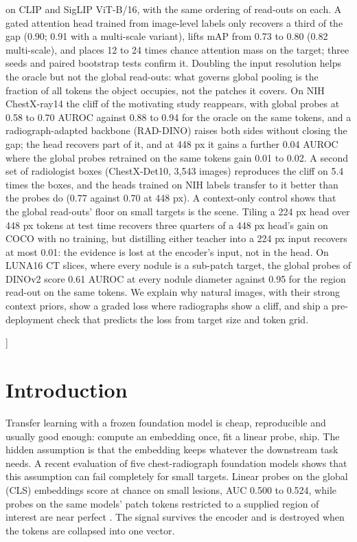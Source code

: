 \documentclass[10pt,letterpaper,twocolumn]{article}
\begin{document}
\begin{@twocolumnfalse}
\begin{list}{}{\setlength{\leftmargin}{0.55in}\setlength{\rightmargin}{0.55in}}
on CLIP and SigLIP ViT-B/16, with the same ordering of read-outs on each. A gated attention head trained from image-level labels only
recovers a third of the gap (0.90; 0.91 with a multi-scale variant), lifts mAP from 0.73 to
0.80 (0.82 multi-scale), and places 12 to 24 times chance attention mass on the target; three
seeds and paired bootstrap tests confirm it. Doubling the input resolution helps the oracle
but not the global read-outs: what governs global pooling is the fraction of all tokens the
object occupies, not the patches it covers. On NIH ChestX-ray14 the cliff of the motivating
study reappears, with global probes at 0.58 to 0.70 AUROC against 0.88 to 0.94 for the oracle
on the same tokens, and a radiograph-adapted backbone (RAD-DINO) raises both sides without
closing the gap; the head recovers part of it, and at 448 px it gains a further 0.04 AUROC
where the global probes retrained on the same tokens gain 0.01 to 0.02. A second set of
radiologist boxes (ChestX-Det10, 3,543 images) reproduces the cliff on 5.4 times the boxes,
and the heads trained on NIH labels transfer to it better than the probes do (0.77 against
0.70 at 448 px). A context-only control shows that the global read-outs' floor on small
targets is the scene. Tiling a 224 px head over 448 px tokens at test time recovers three
quarters of a 448 px head's gain on COCO with no training, but distilling either teacher into
a 224 px input recovers at most 0.01: the evidence is lost at the encoder's input, not in the
head.
On LUNA16 CT slices, where every nodule is a sub-patch target, the global probes of DINOv2
score 0.61 AUROC at every nodule diameter against 0.95 for the region read-out on the same
tokens.
We explain why natural images, with their strong context priors, show a graded loss where
radiographs show a cliff, and ship a pre-deployment check that predicts the loss from target
size and token grid.
\end{list}
\vspace{14pt}
\end{@twocolumnfalse}
]
\makeatother

\section{Introduction}
Transfer learning with a frozen foundation model is cheap, reproducible and usually good
enough: compute an embedding once, fit a linear probe, ship. The hidden assumption is that the
embedding keeps whatever the downstream task needs. A recent evaluation of five chest-radiograph
foundation models shows that this assumption can fail completely for small targets. Linear
probes on the global (CLS) embeddings score at chance on small lesions, AUC 0.500 to 0.524,
while probes on the same models' patch tokens restricted to a supplied region of interest are
near perfect \citep{smalllesion2026}. The signal survives the encoder and is destroyed when the
tokens are collapsed into one vector.
\end{document}
